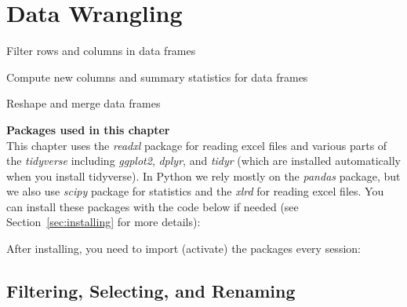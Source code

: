 \chapter{Data Wrangling}
\label{chap:datawrangling}

\begin{abstract}{Abstract}
This chapter shows you how to do ``data wrangling'' in R and Python.
Data wrangling is the process of transforming raw data into a shape that is suitable for analysis. The sections of this chapter first take you through the normal data wrangling pipeline of
filtering, changing, grouping, and joining data. Finally, the last section shows how you can
reshape data.
\end{abstract}


\begin{objectives}
\item Filter rows and columns in data frames
\item Compute new columns and summary statistics for data frames
\item Reshape and merge data frames
\end{objectives}

\newpage
\begin{feature}
  \textbf{Packages used in this chapter}\\
  This chapter uses the \emph{readxl} package for reading excel files and various parts of the \emph{tidyverse} including \emph{ggplot2}, \emph{dplyr}, and \emph{tidyr} (which are installed automatically when you install tidyverse). In Python we rely mostly on the \emph{pandas} package, but we also use \emph{scipy} package for statistics and the \emph{xlrd} for reading excel files. You can install these packages with the code below if needed
  (see Section~\ref{sec:installing} for more details):


\noindent After installing, you need to import (activate) the packages every session:


\end{feature}

\section{Filtering, Selecting, and Renaming}


